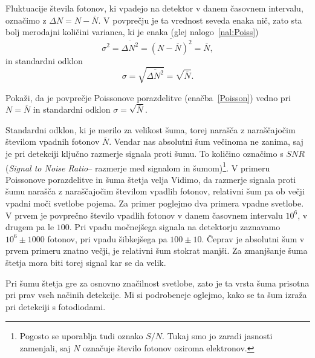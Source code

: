 Fluktuacije števila fotonov, ki vpadejo na detektor v danem časovnem 
intervalu, označimo z $\Delta N = N-\overline{N}$. V povprečju je ta vrednost seveda enaka nič, 
zato sta bolj merodajni količini varianca, ki je enaka (glej nalogo~\ref{nal:Poiss})
\begin{equation}
\sigma^2 = \overline{\Delta N^2}= \overline{(N-\overline{N})^2} = \overline{N},
\label{varianca}
\end{equation}
in standardni odklon
\begin{equation}
\sigma = \sqrt{\overline{\Delta N^2}} = \sqrt{\overline{N}}.
\label{sigma}
\end{equation}
\begin{definition}
Pokaži, da je povprečje Poissonove porazdelitve (enačba~\ref{Poisson}) vedno pri $N = \overline{N}$
in standardni odklon $\sigma = \sqrt{\overline{N}}$.
\label{nal:Poiss}
\end{definition}

Standardni odklon, ki je merilo za velikost šuma, torej narašča z naraščajočim številom 
vpadnih fotonov $\overline{N}$. Vendar nas absolutni šum večinoma ne zanima, 
saj je pri detekciji ključno razmerje 
signala proti šumu. To količino označimo s $SNR$ ({\it Signal to Noise Ratio}-- razmerje med 
signalom in šumom)\footnote{Pogosto se uporablja tudi oznako $S/N$. Tukaj smo jo 
zaradi jasnosti zamenjali, saj $N$ označuje število fotonov oziroma elektronov.}. 
V primeru Poissonove porazdelitve in šuma štetja velja
Vidimo, da razmerje signala proti šumu narašča z naraščajočim številom vpadlih fotonov, 
relativni šum pa ob večji vpadni moči svetlobe pojema. Za primer poglejmo dva primera vpadne svetlobe. 
V prvem je povprečno število vpadlih fotonov v danem časovnem 
intervalu $10^6$, v drugem pa le $100$. Pri vpadu močnejšega signala 
na detektorju zaznavamo $10^6 \pm 1000$ fotonov, pri vpadu šibkejšega
pa $100 \pm 10$. Čeprav je absolutni šum v prvem primeru znatno večji, 
je relativni šum stokrat manjši. Za zmanjšanje šuma štetja mora biti 
torej signal kar se da velik. 

Pri šumu štetja gre za osnovno značilnost svetlobe, zato je ta vrsta šuma
prisotna pri prav vseh načinih detekcije. Mi si podrobeneje oglejmo, 
kako se ta šum izraža pri detekciji s fotodiodami. 

